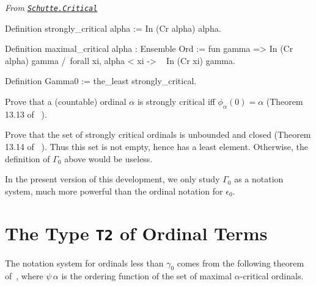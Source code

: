 {\begin{itemize}
\end{itemize}





\vspace{4pt}

\noindent\emph{From \href{../theories/html/hydras.Schutte.Critical.html\#strongly_critical}%
{\texttt{Schutte.Critical}}}

\begin{Coqsrc}
Definition strongly_critical alpha := In (Cr alpha) alpha.

Definition maximal_critical alpha : Ensemble Ord :=
  fun gamma =>
    In (Cr alpha) gamma /\
    forall xi, alpha < xi -> ~ In (Cr xi) gamma.

Definition Gamma0 := the_least strongly_critical.
\end{Coqsrc}

\begin{project}
Prove that a (countable)  ordinal $\alpha$ is strongly critical iff 
$\phi_\alpha(0)=\alpha$ (Theorem 13.13 of~\cite{schutte} ). 
\end{project}


\begin{project}
Prove that the set of strongly critical ordinals is unbounded and closed (Theorem 13.14 of~\cite{schutte} ). Thus this set is not empty,  hence has a least element. Otherwise, the definition of $\Gamma_0$ above would be useless.
\end{project}




In the present version of this development, we  only study $\Gamma_0$ as a notation system, much more powerful than the ordinal notation for $\epsilon_0$.

%




\section{The Type \texttt{T2} of Ordinal Terms}

The notation system for ordinals less than $\gamma_0$ comes from the following theorem of~\cite{schutte}, where $\psi\,\alpha$ is the ordering function 
of the set of maximal $\alpha$-critical ordinals.


}
